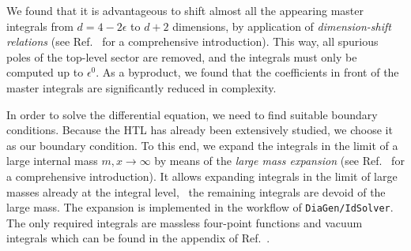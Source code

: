 We found that it is advantageous to shift almost all the appearing master integrals from $d = 4 - 2 \epsilon$ to $d + 2$ dimensions, by application of \textit{dimension-shift relations} (see Ref.~\cite{Weinzierl:2022eaz} for a comprehensive introduction). This way, all spurious poles of the top-level sector are removed, and the integrals must only be computed up to $\epsilon^0$. As a byproduct, we found that the coefficients in front of the master integrals are significantly reduced in complexity.

In order to solve the differential equation, we need to find suitable boundary conditions. Because the \acs{HTL} has already been extensively studied, we choose it as our boundary condition. To this end, we expand the integrals in the limit of a large internal mass $m, x \rightarrow \infty$ by means of the \textit{large mass expansion} (see Ref.~\cite{Smirnov:2002pj} for a comprehensive introduction). It allows expanding integrals in the limit of large masses already at the integral level, \ie\ the remaining integrals are devoid of the large mass. The expansion is implemented in the workflow of \texttt{DiaGen/IdSolver}. The only required integrals are massless four-point functions and vacuum integrals which can be found in the appendix of Ref.~\cite{Niggetiedt:2023ywb}.

